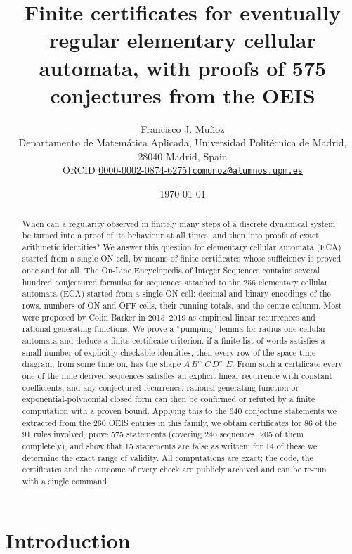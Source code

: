 \documentclass[11pt]{article}
\title{Finite certificates for eventually regular elementary cellular automata, with proofs of 575 conjectures from the OEIS}
\author{Francisco J. Mu\~noz\\ \small Departamento de Matem\'atica Aplicada, Universidad Polit\'ecnica de Madrid, 28040 Madrid, Spain\\ \small ORCID \href{https://orcid.org/0000-0002-0874-6275}{0000-0002-0874-6275}\quad \href{mailto:fcomunoz@alumnos.upm.es}{\texttt{fcomunoz@alumnos.upm.es}}}
\date{\today}
\theoremstyle{definition}
\theoremstyle{remark}
\begin{document}
\maketitle
\begin{abstract}
When can a regularity observed in finitely many steps of a discrete dynamical system be turned into a proof of its behaviour at all times, and then into proofs of exact arithmetic identities? We answer this question for elementary cellular automata (ECA) started from a single ON cell, by means of finite certificates whose sufficiency is proved once and for all. The On-Line Encyclopedia of Integer Sequences contains several hundred conjectured formulas for sequences attached to the 256 elementary cellular automata (ECA) started from a single ON cell: decimal and binary encodings of the rows, numbers of ON and OFF cells, their running totals, and the centre column. Most were proposed by Colin Barker in 2015--2019 as empirical linear recurrences and rational generating functions. We prove a ``pumping'' lemma for radius-one cellular automata and deduce a finite certificate criterion: if a finite list of words satisfies a small number of explicitly checkable identities, then every row of the space-time diagram, from some time on, has the shape $A\,B^m\,C\,D^m\,E$. From such a certificate every one of the nine derived sequences satisfies an explicit linear recurrence with constant coefficients, and any conjectured recurrence, rational generating function or exponential-polynomial closed form can then be confirmed or refuted by a finite computation with a proven bound. Applying this to the 640 conjecture statements we extracted from the 260 OEIS entries in this family, we obtain certificates for 86 of the 91 rules involved, prove 575 statements (covering 246 sequences, 205 of them completely), and show that 15 statements are false as written; for 14 of these we determine the exact range of validity. All computations are exact; the code, the certificates and the outcome of every check are publicly archived and can be re-run with a single command.
\end{abstract}

\section{Introduction}
\end{document}
